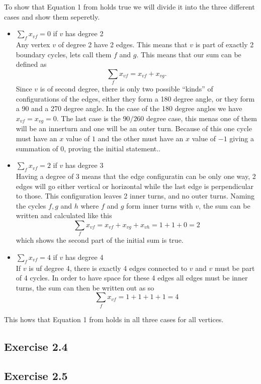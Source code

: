 To show that Equation 1 from \cite{assignment1} holds true we will divide it
into the three different cases and show them seperetly.
\begin{itemize}
\item $\sum_f x_{vf} = 0$ if $v$ has degree 2 \\
  Any vertex $v$ of degree 2 have 2 edges. This means that $v$ is part of
  exactly 2 boundary cycles, lets call them $f$ and $g$. This means that our sum
  can be defined as
  \[
    \sum_f x_{vf} = x_{vf} + x_{vg}.
  \]
  Since $v$ is of second degree, there is only two possible ``kinds'' of
  configurations of the edges, either they form a 180 degree angle, or they form
  a 90 and a 270 degree angle.  In the case of the 180 degree angles we have
  $x_{vf} = x_{vg} = 0$. The last case is the $90/260$ degree case, this menas
  one of them will be an innerturn and one will be an outer turn. Because of
  this one cycle must have an $x$ value of $1$ and the other must have an $x$
  value of $-1$ giving a summation of 0, proving the initial statement..
\item $\sum_f x_{vf} = 2$ if $v$ has degree 3 \\
  Having a degree of 3 means that the edge configuratin can be only one way, 2
  edges will go either vertical or horizontal while the last edge is
  perpendicular to those. This configuration leaves 2 inner turns, and no outer
  turns. Naming the cycles $f, g$ and $h$ where $f$ and $g$ form inner turns
  with $v$, the sum can be written and calculated like this
  \[
    \sum_f x_{vf} = x_{vf} + x_{vg} + x_{vh} = 1 + 1 + 0 = 2
  \]
  which shows the second part of the initial sum is true.

\item $\sum_f x_{vf} = 4$ if $v$ has degree 4 \\
  If $v$ is uf degree 4, there is exactly 4 edges connected to $v$ and $v$ must
  be part of 4 cycles. In order to have space for these 4 edges all edges must
  be inner turns, the sum can then be written out as so
  \[
    \sum_f x_{vf} = 1 + 1 + 1 + 1 = 4
  \]
\end{itemize}


This hows that Equation 1 from \cite{assignment1} holds in all three cases for
all vertices.

\subsection{Exercise 2.4}



\subsection{Exercise 2.5}
